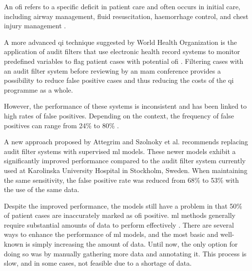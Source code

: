 \documentclass[12pt, letterpaper]{article}
\begin{document}
An \acrshort{ofi} refers to a specific deficit in patient care and often occurs in initial care, including airway management, fluid resuscitation, haemorrhage control, and chest injury management \cite{world_health_organization_guidelines_2009,roy_learning_2017,oreilly_opportunities_2013,sanddal_analysis_2011}.

A more advanced \acrshort{qi} technique suggested by World Health Organization is the application of audit filters that use electronic health record systems to monitor predefined variables to flag patient cases with potential \acrfull{ofi} \cite{world_health_organization_guidelines_2009}. Filtering cases with an audit filter system before reviewing by an \acrshort{mam} conference provides a possibility to reduce false positive cases and thus reducing the costs of the \acrshort{qi} programme as a whole.

However, the performance of these systems is inconsistent and has been linked to high rates of false positives. Depending on the context, the frequency of false positives can range from 24\% to 80\% \cite{attergrim_predicting_2023,sanddal_analysis_2011,roy_learning_2017,ghorbani_analysis_2018}.

A new approach proposed by Attegrim and Szolnoky et al. \cite{attergrim_predicting_2023} recommends replacing audit filter systems with supervised \acrfull{ml} models. These newer models exhibit a significantly improved performance compared to the audit filter system currently used at Karolinska University Hospital in Stockholm, Sweden. When maintaining the same sensitivity, the false positive rate was reduced from 68\% to 53\% with the use of the same data.


Despite the improved performance, the models still have a problem in that 50\% of patient cases are inaccurately marked as \acrshort{ofi} positive. \acrshort{ml} methods generally require substantial amounts of data to perform effectively \cite{piccialli_survey_2021}. There are several ways to enhance the performance of \acrshort{ml} models, and the most basic and well-known is simply increasing the amount of data. Until now, the only option for doing so was by manually gathering more data and annotating it. This process is slow, and in some cases, not feasible due to a shortage of data.
\end{document}
